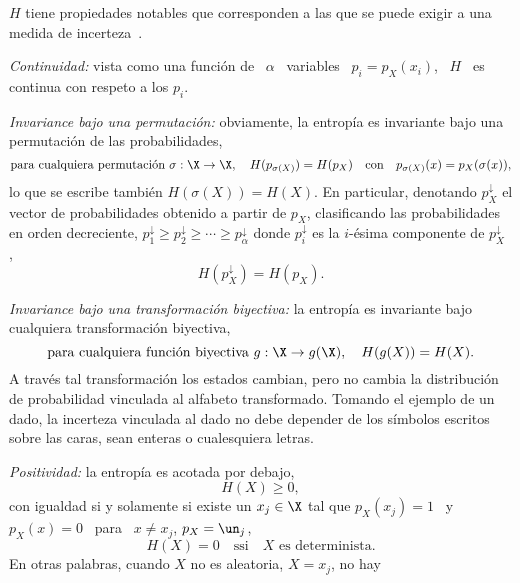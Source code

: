  $H$ tiene propiedades notables que corresponden
a  las que  se puede  exigir a  una medida  de  incerteza~\cite{Sha48, ShaWea64,
  CovTho06, Rio07, DemCov91, Joh04}.
%
\begin{propiedades}
\item\label{Prop:SZ:continuidad} {\it Continuidad:}  vista como una funci\'on de
  \ $\alpha$ \ variables  \ $p_i = p_X(x_i)$, \ $H$ \  es continua con respeto a
  los $p_i$.
%
\setcounter{PropPermutacion}{\value{enumi}}
\item\label{Prop:SZ:permutacion}   {\it  Invariance  bajo   una  permutaci\'on:}
  obviamente,  la  entrop\'ia  es  invariante  bajo  una  permutaci\'on  de  las
  probabilidades, \ie
  \[
  \mbox{para   cualquiera   permutaci\'on   }   \sigma:   \X   \to   \X,   \quad
  H(p_{\sigma(X)})   =  H(p_X)   \quad  \mbox{con}   \quad   p_{\sigma(X)}(x)  =
  p_X(\sigma(x)),
  \]
  lo que se  escribe tambi\'en $H(\sigma(X)) = H(X)$.   En particular, denotando
  $p_X^\downarrow$  el vector  de  probabilidades obtenido  a  partir de  $p_X$,
  clasificando  las  probabilidades en  orden  decreciente, $p_1^\downarrow  \ge
  p_2^\downarrow \ge  \cdots \ge p_\alpha^\downarrow$  donde $p_i^\downarrow$ es
  la     $i$-\'esima      componente     de     $p_X^\downarrow$     ,
  \[
  H(p_X^\downarrow) = H(p_X).
  \]
%
\setcounter{PropBiyeccion}{\value{enumi}}
\item\label{Prop:SZ:biyeccion}   {\it  Invariance   bajo   una  transformaci\'on
    biyectiva:}  la entrop\'ia  es invariante  bajo  cualquiera transformaci\'on
  biyectiva, \ie
  \[
  \mbox{para cualquiera  funci\'on biyectiva } g:  \X \to g(\X),  \quad H(g(X)) =
  H(X).
  \]
  A  trav\'es  tal transformaci\'on  los  estados  cambian,  pero no  cambia  la
  distribuci\'on de probabilidad vinculada al alfabeto transformado.  Tomando el
  ejemplo de  un dado, la  incerteza vinculada al  dado no debe depender  de los
  s\'imbolos escritos sobre las caras, sean enteras o cualesquiera letras.
%
\item\label{Prop:SZ:positividad} {\it Positividad:} la entrop\'ia es acotada por
  debajo,
  \[
  H(X) \ge 0,
  \]
  con igualdad si y solamente si existe un $x_j \in \X$ tal que $p_X(x_j) = 1$ \
  y \ $p_X(x) = 0$ \ para \ $x \ne x_j$, \ie $p_X = \un_j$,
  \[
  H(X)  =  0 \quad  \mbox{ssi}  \quad X  \mbox{  es  determinista.}
  \]
  En  otras  palabras, cuando  $X$  no  es aleatoria,  \ie  $X  =  x_j$, no  hay

\end{propiedades}
